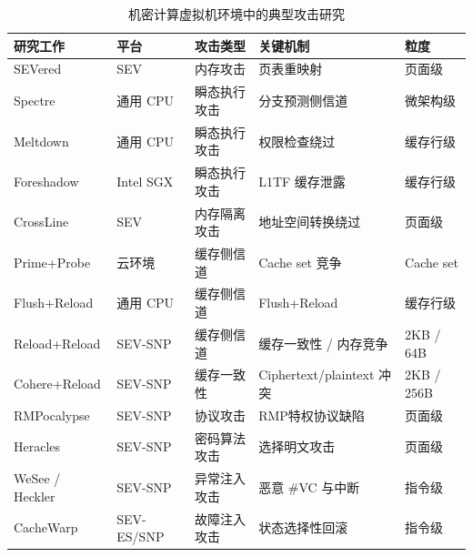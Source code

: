 \begin{table}[h]
  \centering
  \renewcommand{\arraystretch}{1.16}
  \caption{机密计算虚拟机环境中的典型攻击研究}
  \label{tab:cvm_attacks}
  \begin{tabular}{p{3.5cm}p{2.2cm}p{2.5cm}p{3.8cm}p{2cm}}
    \hline
    研究工作 & 平台 & 攻击类型 & 关键机制 & 粒度 \\
    \hline
    SEVered \cite{morbitzer2018severed}
    & SEV
    & 内存攻击
    & 页表重映射
    & 页面级 \\

    Spectre \cite{kocher2020spectre}
    & 通用 CPU
    & 瞬态执行攻击
    & 分支预测侧信道
    & 微架构级 \\

    Meltdown \cite{lipp2018meltdown}
    & 通用 CPU
    & 瞬态执行攻击
    & 权限检查绕过
    & 缓存行级 \\

    Foreshadow \cite{bulck2018foreshadow}
    & Intel SGX
    & 瞬态执行攻击
    & L1TF 缓存泄露
    & 缓存行级 \\

    CrossLine \cite{li2021crossline}
    & SEV
    & 内存隔离攻击
    & 地址空间转换绕过
    & 页面级 \\

    Prime+Probe \cite{osvik2006cache}
    & 云环境
    & 缓存侧信道
    & Cache set 竞争
    & Cache set \\

    Flush+Reload \cite{yarom2014flushreload}
    & 通用 CPU
    & 缓存侧信道
    & Flush+Reload
    & 缓存行级 \\

    Reload+Reload \cite{chiang2025reloadreload}
    & SEV-SNP
    & 缓存侧信道
    & 缓存一致性 / 内存竞争
    & 2KB / 64B \\

    Cohere+Reload \cite{giner2025coherereload}
    & SEV-SNP
    & 缓存一致性
    & Ciphertext/plaintext 冲突
    & 2KB / 256B \\

    RMPocalypse \cite{schlüter2025rmpocalypse}
    & SEV-SNP
    & 协议攻击
    & RMP特权协议缺陷
    & 页面级 \\

    Heracles \cite{schlüter2025heracles}
    & SEV-SNP
    & 密码算法攻击
    & 选择明文攻击
    & 页面级 \\

    WeSee / Heckler \cite{schluter2024wesee, schluter2024heckler}
    & SEV-SNP
    & 异常注入攻击
    & 恶意 \#VC 与中断
    & 指令级 \\

    CacheWarp \cite{zhang2024cachewarp}
    & SEV-ES/SNP
    & 故障注入攻击
    & 状态选择性回滚
    & 指令级 \\

    \hline
  \end{tabular}
\end{table}

